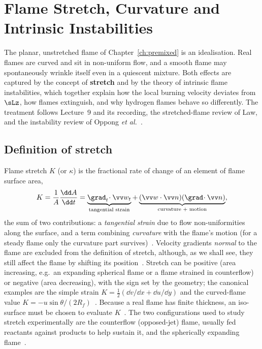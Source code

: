 \chapter{Flame Stretch, Curvature and Intrinsic Instabilities}\label{ch:stretch}

The planar, unstretched flame of Chapter~\ref{ch:premixed} is an idealisation. Real flames are curved and sit in non-uniform flow, and a smooth flame may spontaneously wrinkle itself even in a quiescent mixture. Both effects are captured by the concept of \textbf{stretch} and by the theory of intrinsic flame instabilities, which together explain how the local burning velocity deviates from $\sLz$, how flames extinguish, and why hydrogen flames behave so differently. The treatment follows Lecture~9 and its recording, the stretched-flame review of Law, and the instability review of Oppong \emph{et al.}~\cite{lecture9,transcript_l9,Law1988,oppong2022instability}.

\section{Definition of stretch}

Flame stretch $K$ (or $\kappa$) is the fractional rate of change of an element of flame surface area,
\begin{equation}
K=\frac{1}{A}\frac{\dd A}{\dd t}=\underbrace{\grad_t\!\cdot\vv w_t}_{\text{tangential strain}}+\underbrace{(\vv w\cdot\vv n)(\grad\!\cdot\vv n)}_{\text{curvature + motion}},
\label{eq:stretch}
\end{equation}
the sum of two contributions: a \emph{tangential strain} due to flow non-uniformities along the surface, and a term combining \emph{curvature} with the flame's motion (for a steady flame only the curvature part survives)~\cite{lecture9,Law1988}. Velocity gradients \emph{normal} to the flame are excluded from the definition of stretch, although, as we shall see, they still affect the flame by shifting its position~\cite{transcript_l9}. Stretch can be positive (area increasing, e.g.\ an expanding spherical flame or a flame strained in counterflow) or negative (area decreasing), with the sign set by the geometry; the canonical examples are the simple strain $K=\tfrac12(\dd v/\dd x+\dd u/\dd y)$ and the curved-flame value $K=-u\sin\theta/(2R_f)$~\cite{lecture9}. Because a real flame has finite thickness, an iso-surface must be chosen to evaluate $K$~\cite{lecture9}. The two configurations used to study stretch experimentally are the counterflow (opposed-jet) flame, usually fed reactants against products to help sustain it, and the spherically expanding flame~\cite{transcript_l9}.

